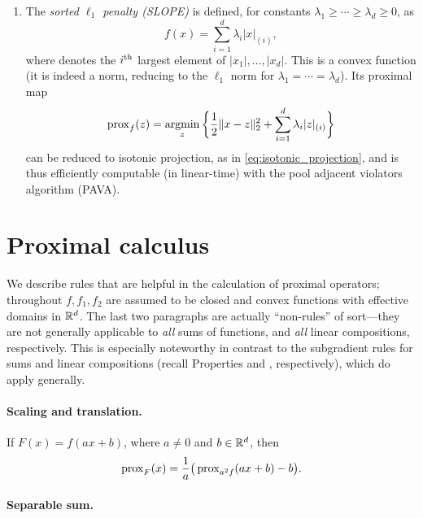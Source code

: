 \begin{Example}
\begin{enumerate}[label=\alph*., ref=\alph*]
\item {}
  The \emph{sorted $\ell_1$ penalty (SLOPE)} is defined, for constants
  $\lambda_1 \geq \cdots \geq \lambda_d \geq 0$, as 
  \begin{equation}
  \label{eq:slope}
  f(x) = \sum_{i=1}^d \lambda_i |x|_{(i)},
  \end{equation}
  where  denotes the $i^{\textnormal{th}}$ largest element of $|x_1|,
  \dots, |x_d|$. This is a convex function (it is indeed a norm, reducing to
  the $\ell_1$ norm for $\lambda_1 = \cdots = \lambda_d$). Its proximal map   
  \[
  \operatorname{prox}_f(z) = \operatorname*{argmin}_z \bigg\{ \frac{1}{2} \|x - z\|_2^2 +
  \sum_{i=1}^d \lambda_i |z|_{(i)} \bigg\}
  \]
  can be reduced to isotonic projection, as in \eqref{eq:isotonic_projection},
  and is thus efficiently computable (in linear-time) with the pool adjacent
  violators algorithm (PAVA). 
\end{enumerate}
\end{Example}

\section{Proximal calculus}

We describe rules that are helpful in the calculation of proximal operators; 
throughout $f,f_1,f_2$ are assumed to be closed and convex functions with
effective domains in $\mathbb{R}^d$. The last two paragraphs are actually ``non-rules''
of sort---they are not generally applicable to \emph{all} sums of functions, 
and \emph{all} linear compositions, respectively. This is especially noteworthy
in contrast to the subgradient rules for sums and linear compositions (recall
Properties  and , 
respectively), which do apply generally. 

\paragraph{Scaling and translation.}

If $F(x) = f(ax + b)$, where $a \not= 0$ and $b \in \mathbb{R}^d$, then 
\[ 
\operatorname{prox}_F(x) = \frac{1}{a} \big( \operatorname{prox}_{a^2 f}(ax + b) - b \big).
\]

\paragraph{Separable sum.}

